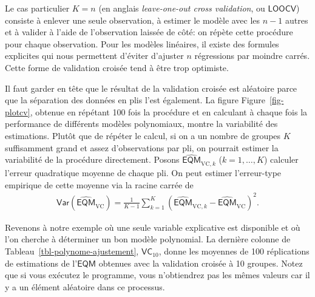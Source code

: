 \documentclass[
  11pt,
  letterpaper,
]{scrbook}
\newenvironment{Shaded}{\begin{snugshade}}{\end{snugshade}}
\newcommand{\AttributeTok}[1]{\textcolor[rgb]{0.40,0.45,0.13}{#1}}
\newcommand{\CommentTok}[1]{\textcolor[rgb]{0.37,0.37,0.37}{#1}}
\newcommand{\DecValTok}[1]{\textcolor[rgb]{0.68,0.00,0.00}{#1}}
\newcommand{\FunctionTok}[1]{\textcolor[rgb]{0.28,0.35,0.67}{#1}}
\newcommand{\NormalTok}[1]{\textcolor[rgb]{0.00,0.23,0.31}{#1}}
\newcommand{\OtherTok}[1]{\textcolor[rgb]{0.00,0.23,0.31}{#1}}
\newcommand{\SpecialCharTok}[1]{\textcolor[rgb]{0.37,0.37,0.37}{#1}}
\newcommand{\StringTok}[1]{\textcolor[rgb]{0.13,0.47,0.30}{#1}}
\theoremstyle{definition}
\theoremstyle{remark}
\begin{document}
\begin{Shaded}
\end{Shaded}

Le cas particulier \(K=n\) (en anglais \emph{leave-one-out cross
validation}, ou \(\mathsf{LOOCV}\)) consiste à enlever une seule
observation, à estimer le modèle avec les \(n-1\) autres et à valider à
l'aide de l'observation laissée de côté: on répète cette procédure pour
chaque observation. Pour les modèles linéaires, il existe des formules
explicites qui nous permettent d'éviter d'ajuster \(n\) régressions par
moindre carrés. Cette forme de validation croisée tend à être trop
optimiste.

Il faut garder en tête que le résultat de la validation croisée est
aléatoire parce que la séparation des données en plis l'est également.
La figure Figure~\ref{fig-plotcv}, obtenue en répétant 100 fois la
procédure et en calculant à chaque fois la performance de différents
modèles polynomiaux, montre la variabilité des estimations. Plutôt que
de répéter le calcul, si on a un nombre de groupes \(K\) suffisamment
grand et assez d'observations par pli, on pourrait estimer la
variabilité de la procédure directement. Posons
\(\widehat{\mathsf{EQM}}_{\text{VC}, k}\) (\(k=1, \ldots, K\)) calculer
l'erreur quadratique moyenne de chaque pli. On peut estimer
l'erreur-type empirique de cette moyenne via la racine carrée de
\begin{align*}
\mathsf{Var}(\widehat{\mathsf{EQM}}_{\text{VC}}) = \frac{1}{K-1} \sum_{k=1}^{K} (\widehat{\mathsf{EQM}}_{\text{VC}, k}-\widehat{\mathsf{EQM}}_{\text{VC}})^2.
\end{align*}

Revenons à notre exemple où une seule variable explicative est
disponible et où l'on cherche à déterminer un bon modèle polynomial. La
dernière colonne de Tableau~\ref{tbl-polynome-ajustement},
\(\mathsf{VC}_{10}\), donne les moyennes de 100 réplications de
estimations de l'\(\mathsf{EQM}\) obtenues avec la validation croisée à
10 groupes. Notez que si vous exécutez le programme, vous n'obtiendrez
pas les mêmes valeurs car il y a un élément aléatoire dans ce processus.
\end{document}
